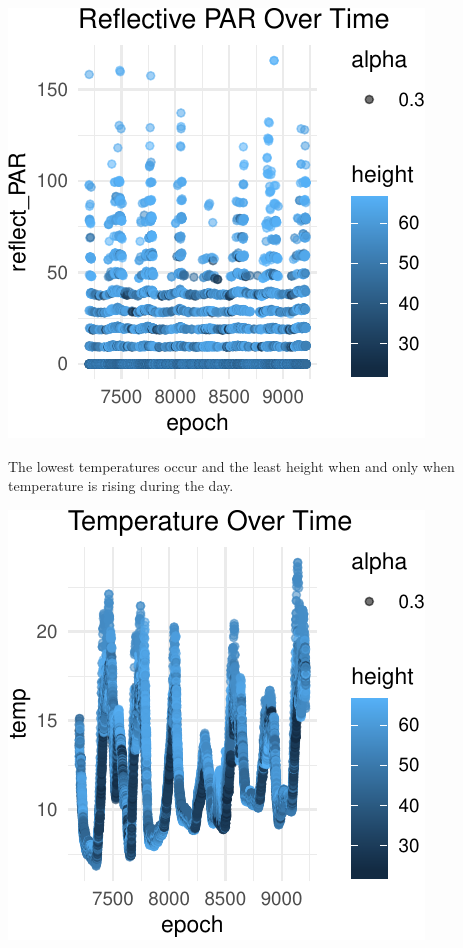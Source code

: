 \documentclass[]{article}
\begin{document}
\begin{center}\includegraphics{Project1WriteUp_files/figure-latex/unnamed-chunk-17-2} \end{center}

The lowest temperatures occur and the least height when and only when
temperature is rising during the day.

\begin{center}\includegraphics{Project1WriteUp_files/figure-latex/unnamed-chunk-18-1} \end{center}
\end{document}
